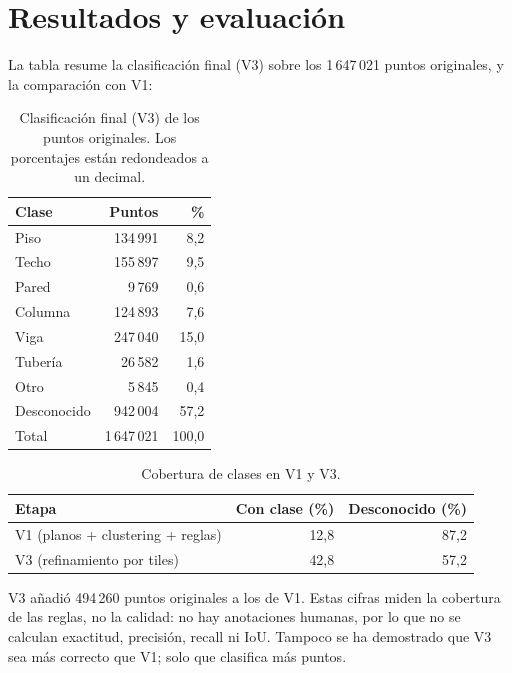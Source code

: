 \documentclass[11pt,a4paper]{article}
\begin{document}
\section{Resultados y evaluación}
\label{sec:resultados}
La tabla resume la clasificación final (V3) sobre los 1\,647\,021 puntos originales, y la comparación con V1:

\begin{table}[H]
\centering
\begin{tabular}{lrr}
\toprule
Clase & Puntos & \% \\
\midrule
Piso & 134\,991 & 8,2 \\
Techo & 155\,897 & 9,5 \\
Pared & 9\,769 & 0,6 \\
Columna & 124\,893 & 7,6 \\
Viga & 247\,040 & 15,0 \\
Tubería & 26\,582 & 1,6 \\
Otro & 5\,845 & 0,4 \\
Desconocido & 942\,004 & 57,2 \\
\midrule
Total & 1\,647\,021 & 100,0 \\
\bottomrule
\end{tabular}
\caption{Clasificación final (V3) de los puntos originales. Los porcentajes están redondeados a un decimal.}
\end{table}

\begin{table}[H]
\centering
\begin{tabular}{lrr}
\toprule
Etapa & Con clase (\%) & Desconocido (\%) \\
\midrule
V1 (planos + clustering + reglas) & 12,8 & 87,2 \\
V3 (refinamiento por tiles) & 42,8 & 57,2 \\
\bottomrule
\end{tabular}
\caption{Cobertura de clases en V1 y V3.}
\end{table}

V3 añadió 494\,260 puntos originales a los de V1. Estas cifras miden la cobertura de las reglas, no la calidad: no hay anotaciones humanas, por lo que no se calculan exactitud, precisión, recall ni IoU. Tampoco se ha demostrado que V3 sea más correcto que V1; solo que clasifica más puntos.
\end{document}
